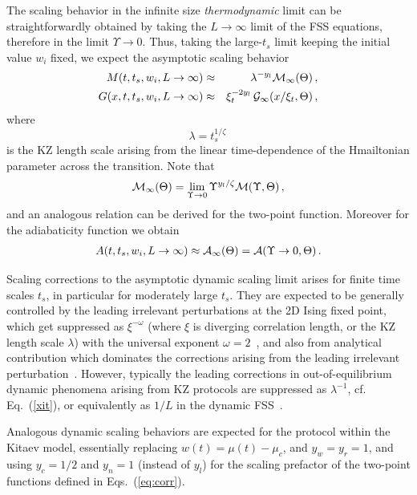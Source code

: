 The scaling behavior in the infinite size {\em thermodynamic} limit
can be straightforwardly obtained by taking the $L\to\infty$ limit of
the FSS equations, therefore in the limit $\Upsilon\to 0$.  Thus,
taking the large-$t_s$ limit keeping the initial value $w_i$ fixed, we
expect the asymptotic scaling behavior
\begin{eqnarray}
  M(t,t_s,w_i,L\to\infty) &\approx&
  \lambda^{-y_l} {\cal M}_\infty(\Theta)\,,
  \label{magsca3}\\
    G(x,t,t_s,w_i,L\to\infty) &\approx& \xi_t^{-2y_l}\, {\cal
      G}_\infty(x/\xi_t,\Theta)\,,
  \label{G2sca3}
\end{eqnarray}
where
\begin{equation}
  \lambda = t_s^{1/\zeta} \,
  \label{xit}
\end{equation}
is the KZ length scale arising from the linear time-dependence of the
Hmailtonian parameter across the transition.  Note that
\begin{eqnarray}
  {\cal M}_\infty(\Theta) = \lim_{\Upsilon\to 0}
  \Upsilon^{y_l/\zeta} {\cal M}(\Upsilon,\Theta)\,,
  \label{minftyrel}
\end{eqnarray}
and an analogous relation can be derived for the two-point function.
Moreover for the adiabaticity function we obtain
\begin{eqnarray}
  A(t,t_s,w_i,L\to\infty) \approx {\cal A}_\infty(\Theta) =
  {\cal A}(\Upsilon\to 0,\Theta)\,.
\label{wsca3}
\end{eqnarray}


Scaling corrections to the asymptotic dynamic scaling limit arises for
finite time scales $t_s$, in particular for moderately large $t_s$.
They are expected to be generally controlled by the leading irrelevant
perturbations at the 2D Ising fixed point, which get suppressed as
$\xi^{-\omega}$ (where $\xi$ is diverging correlation length, or the
KZ length scale $\lambda$) with the universal exponent
$\omega=2$~\cite{CHPV-02,CCCPV-00,CH-00,CPRV-98,CPV-14}, and also from
analytical contribution which dominates the corrections arising from
the leading irrelevant perturbation~\cite{PV-02,RV-21}. However,
typically the leading corrections in out-of-equilibrium dynamic
phenomena arising from KZ protocols are suppressed as $\lambda^{-1}$,
cf. Eq.~(\ref{xit}), or equivalently as $1/L$ in the dynamic
FSS~\cite{RV-21}.


Analogous dynamic scaling behaviors are expected for the protocol
within the Kitaev model, essentially replacing $w(t) = \mu(t)-\mu_c$,
and $y_w = y_r = 1$, and using $y_c=1/2$ and $y_n=1$ (instead of
$y_l$) for the scaling prefactor of the two-point functions defined in
Eqs.~(\ref{eq:corr}).


